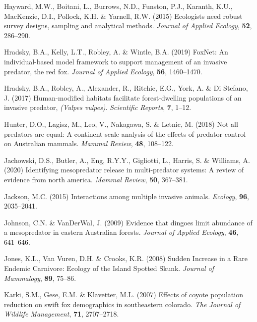 \documentclass[]{elsarticle} %
\begin{document}
\leavevmode\hypertarget{ref-hayward2015ecologists}{}%
Hayward, M.W., Boitani, L., Burrows, N.D., Funston, P.J., Karanth, K.U., MacKenzie, D.I., Pollock, K.H. \& Yarnell, R.W. (2015) Ecologists need robust survey designs, sampling and analytical methods. \emph{Journal of Applied Ecology}, \textbf{52}, 286--290.

\leavevmode\hypertarget{ref-hradsky2019foxnet}{}%
Hradsky, B.A., Kelly, L.T., Robley, A. \& Wintle, B.A. (2019) FoxNet: An individual-based model framework to support management of an invasive predator, the red fox. \emph{Journal of Applied Ecology}, \textbf{56}, 1460--1470.

\leavevmode\hypertarget{ref-hradsky2017human}{}%
Hradsky, B.A., Robley, A., Alexander, R., Ritchie, E.G., York, A. \& Di Stefano, J. (2017) Human-modified habitats facilitate forest-dwelling populations of an invasive predator, \emph{(Vulpes vulpes)}. \emph{Scientific Reports}, \textbf{7}, 1--12.

\leavevmode\hypertarget{ref-hunter2018not}{}%
Hunter, D.O., Lagisz, M., Leo, V., Nakagawa, S. \& Letnic, M. (2018) Not all predators are equal: A continent-scale analysis of the effects of predator control on Australian mammals. \emph{Mammal Review}, \textbf{48}, 108--122.

\leavevmode\hypertarget{ref-jachowski2020identifying}{}%
Jachowski, D.S., Butler, A., Eng, R.Y.Y., Gigliotti, L., Harris, S. \& Williams, A. (2020) Identifying mesopredator release in multi-predator systems: A review of evidence from north america. \emph{Mammal Review}, \textbf{50}, 367--381.

\leavevmode\hypertarget{ref-jackson2015interactions}{}%
Jackson, M.C. (2015) Interactions among multiple invasive animals. \emph{Ecology}, \textbf{96}, 2035--2041.

\leavevmode\hypertarget{ref-johnson2009evidence}{}%
Johnson, C.N. \& VanDerWal, J. (2009) Evidence that dingoes limit abundance of a mesopredator in eastern Australian forests. \emph{Journal of Applied Ecology}, \textbf{46}, 641--646.

\leavevmode\hypertarget{ref-jones2008sudden}{}%
Jones, K.L., Van Vuren, D.H. \& Crooks, K.R. (2008) Sudden Increase in a Rare Endemic Carnivore: Ecology of the Island Spotted Skunk. \emph{Journal of Mammalogy}, \textbf{89}, 75--86.

\leavevmode\hypertarget{ref-karki2007effects}{}%
Karki, S.M., Gese, E.M. \& Klavetter, M.L. (2007) Effects of coyote population reduction on swift fox demographics in southeastern colorado. \emph{The Journal of Wildlife Management}, \textbf{71}, 2707--2718.
\end{document}
